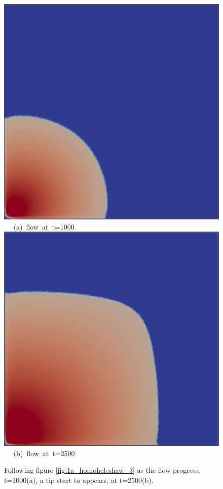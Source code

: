 \begin{figure}[ht] 
\vbox{
\hbox{\hspace{2.5cm}
\includegraphics[width=.6\textwidth]{./Pics1/Saffman_homogeneous_MR3/saffman_homo_fixed_1000.pdf} 
}
\vspace{0.0cm}
\hbox{\hspace{5.0cm} (a) flow at t=1000   
}
\vspace{0.25cm}
\hbox{\hspace{2.5cm}
\includegraphics[width=.6\textwidth]{./Pics1/Saffman_homogeneous_MR3/saffman_homo_fixed_2500.pdf}
}
\vspace{0.0cm}
\hbox{\hspace{5.0cm} (b) flow at t=2500  
}
}     
\caption{Following figure \ref{fig:1a_homoheleshaw_3} as the flow progress, t=1000(a), a tip start to appears, at t=2500(b).}
\label{fig:1b_homoheleshaw_3}
\end{figure}
\clearpage


